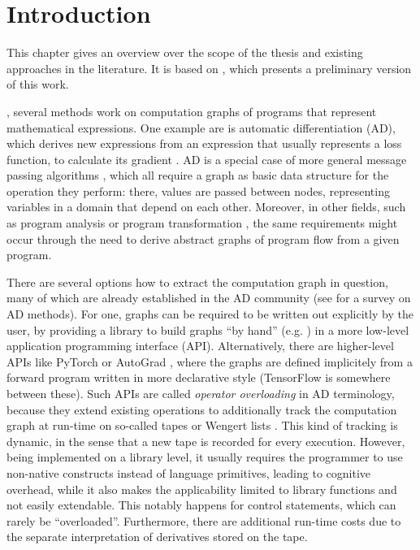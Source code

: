 \chapter{Introduction}
\label{cha:introduction}

This chapter gives an overview over the scope of the thesis and existing approaches in the
literature.  It is based on \textcite{gabler2019graph}, which presents a preliminary version of this
work.

, several methods work on computation graphs of programs that
represent mathematical expressions.  One example are is automatic differentiation (AD), which
derives new expressions from an expression that usually represents a loss function, to calculate its
gradient \parencite{griewank2008evaluating, gebremedhin2020introduction}.  AD is a special case of
more general message passing algorithms
\parencite{minka2005divergence,ruozzi2011message,minka2019automatic}, which all require a graph as
basic data structure for the operation they perform: there, values are passed between nodes,
representing variables in a domain that depend on each other.  Moreover, in other fields, such as
program analysis or program transformation
\parencite[cf.][]{muchnick1997advanced,singer2018static,aho1986compilers}, the same requirements
might occur through the need to derive abstract graphs of program flow from a given program.

There are several options how to extract the computation graph in question, many of which are
already established in the AD community (see \textcite{baydin2018automatic} for a survey on AD
methods).  For one, graphs can be required to be written out explicitly by the user, by providing a
library to build graphs \enquote{by hand} (e.g. \textcite{chewxy2020gorgonia,jia2014caffe}) in a
more low-level application programming interface (API).  Alternatively, there are higher-level APIs
like PyTorch \parencite{paszke2017automatic} or AutoGrad \parencite{maclaurin2015autograd}, where
the graphs are defined implicitely from a forward program written in more declarative style
(TensorFlow \parencite{abadi2015tensorflow} is somewhere between these).  Such APIs are called
\emph{operator overloading} in AD terminology, because they extend existing operations to
additionally track the computation graph at run-time on so-called tapes or Wengert lists
\parencite{bartholomew-biggs2000automatic}.  This kind of tracking is dynamic, in the sense that a
new tape is recorded for every execution.  However, being implemented on a library level, it usually
requires the programmer to use non-native constructs instead of language primitives, leading to
cognitive overhead, while it also makes the applicability limited to library functions and not
easily extendable.  This notably happens for control statements, which can rarely be
\enquote{overloaded}.  Furthermore, there are additional run-time costs due to the separate
interpretation of derivatives stored on the tape.

